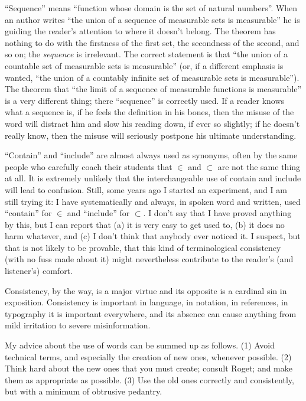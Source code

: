 \documentclass[12pt]{article}
\begin{document}
``Sequence'' means ``function whose domain is the set of natural numbers''. When an author writes ``the union of a sequence of measurable sets is measurable'' he is guiding the reader's attention to where it doesn't belong. The theorem has nothing to do with the firstness of the first set, the secondness of the second, and so on; the \emph{sequence} is irrelevant. The correct statement is that ``the union of a countable set of measurable sets is measurable'' (or, if a different emphasis is wanted, ``the union of a countably infinite set of measurable sets is measurable''). The theorem that ``the limit of a sequence of measurable functions is measurable'' is a very different thing; there ``sequence'' is correctly used. If a reader knows what a sequence is, if he feels the definition in his bones, then the misuse of the word will distract him and slow his reading down, if ever so slightly; if he doesn't really know, then the misuse will seriously postpone his ultimate understanding.

``Contain'' and ``include'' are almost always used as synonyms, often by the same people who carefully coach their students that $\in$ and $\subset$ are not the same thing at all. It is extremely unlikely that the interchangeable use of contain and include will lead to confusion. Still, some years ago I started an experiment, and I am still trying it: I have systematically and always, in spoken word and written, used ``contain'' for $\in$ and ``include'' for $\subset$. I don't say that I have proved anything by this, but I can report that (a) it is very easy to get used to, (b) it does no harm whatever, and (c) I don't think that anybody ever noticed it. I suspect, but that is not likely to be provable, that this kind of terminological consistency (with no fuss made about it) might nevertheless contribute to the reader's (and listener's) comfort. 

Consistency, by the way, is a major virtue and its opposite is a cardinal sin in exposition. Consistency is important in language, in notation, in references, in typography it is important everywhere, and its absence can cause anything from mild irritation to severe misinformation. 

My advice about the use of words can be summed up as follows. (1) Avoid technical terms, and especially the creation of new ones, whenever possible. (2) Think hard about the new ones that you must create; consult Roget; and make them as appropriate as possible. (3) Use the old ones correctly and consistently, but with a minimum of obtrusive pedantry.
\end{document}

